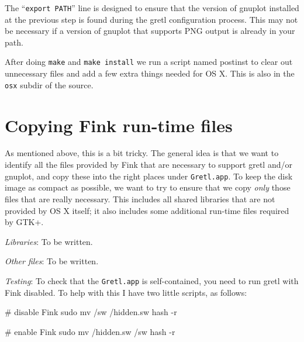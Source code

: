 \documentclass{article}
\begin{document}
The ``\texttt{export PATH}'' line is designed to ensure that the
version of gnuplot installed at the previous step is found during the
gretl configuration process.  This may not be necessary if a version
of gnuplot that supports PNG output is already in your path.

After doing \texttt{make} and \texttt{make install} we run a script
named postinst to clear out unnecessary files and add a few extra
things needed for OS X.  This is also in the \texttt{osx} subdir of
the source.


\section{Copying Fink run-time files}

As mentioned above, this is a bit tricky.  The general idea is that we
want to identify all the files provided by Fink that are necessary to
support gretl and/or gnuplot, and copy these into the right places
under \texttt{Gretl.app}.  To keep the disk image as compact as
possible, we want to try to ensure that we copy \textit{only} those
files that are really necessary.  This includes all shared libraries
that are not provided by OS X itself; it also includes some additional
run-time files required by GTK+.

\textit{Libraries}: To be written.

\textit{Other files}: To be written.

\textit{Testing}: To check that the \texttt{Gretl.app} is
self-contained, you need to run gretl with Fink disabled.  To help
with this I have two little scripts, as follows:

\begin{code}
# disable Fink
sudo mv /sw /hidden.sw
hash -r

# enable Fink
sudo mv /hidden.sw /sw
hash -r

\end{code}
\end{document}
